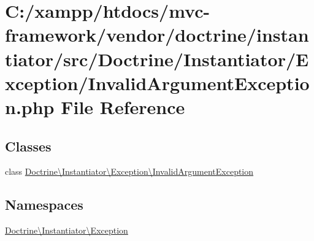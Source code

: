 \hypertarget{doctrine_2instantiator_2src_2_doctrine_2_instantiator_2_exception_2_invalid_argument_exception_8php}{}\section{C\+:/xampp/htdocs/mvc-\/framework/vendor/doctrine/instantiator/src/\+Doctrine/\+Instantiator/\+Exception/\+Invalid\+Argument\+Exception.php File Reference}
\label{doctrine_2instantiator_2src_2_doctrine_2_instantiator_2_exception_2_invalid_argument_exception_8php}
\subsection*{Classes}
\begin{DoxyCompactItemize}
\item 
class \hyperlink{class_doctrine_1_1_instantiator_1_1_exception_1_1_invalid_argument_exception}{Doctrine\textbackslash{}\+Instantiator\textbackslash{}\+Exception\textbackslash{}\+Invalid\+Argument\+Exception}
\end{DoxyCompactItemize}
\subsection*{Namespaces}
\begin{DoxyCompactItemize}
\item 
 \hyperlink{namespace_doctrine_1_1_instantiator_1_1_exception}{Doctrine\textbackslash{}\+Instantiator\textbackslash{}\+Exception}
\end{DoxyCompactItemize}
